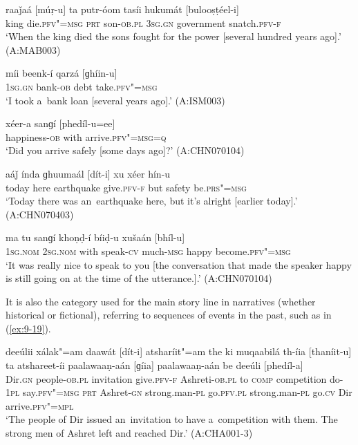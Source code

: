 \begin{exe}
\ex
\label{ex:9-14}
\gll raaǰaá [múṛ-u] ta putr-óom tasíi hukumát [bulooṣṭéel-i] \\
king die.\textsc{pfv"=msg} \textsc{prt} son-\textsc{ob.pl} \textsc{3sg.gn} government snatch.\textsc{pfv-f} \\
\glt `When the king died the sons fought for the power [several hundred years ago].' (A:MAB003)

\ex
\label{ex:9-15}
\gll míi beenk-í qarzá [ɡhíin-u]  \\
\textsc{1sg.gn} bank-\textsc{ob} debt take.\textsc{pfv"=msg} \\
\glt `I took a~bank loan [several years ago].' (A:ISM003) 

\ex
\label{ex:9-16}
\gll xéer-a sanɡí [phedíl-u=ee] \\
happiness-\textsc{ob} with arrive.\textsc{pfv"=msg=q} \\
\glt `Did you arrive safely [some days ago]?' (A:CHN070104)

\ex
\label{ex:9-17}
\gll aáǰ índa ɡhuumaál [dít-i] xu xéer hín-u \\
today here earthquake give.\textsc{pfv-f} but safety be.\textsc{prs"=msg}  \\
\glt `Today there was an~earthquake here, but it's alright [earlier today].' (A:CHN070403)

\ex
\label{ex:9-18}
\gll ma tu sanɡí khoṇḍ-í bíiḍ-u xušaán [bhíl-u] \\
\textsc{1sg.nom} \textsc{2}\textsc{sg.nom} with speak-\textsc{cv} much-\textsc{msg} happy become.\textsc{pfv"=msg} \\
\glt `It was really nice to speak to you [the conversation that made the speaker happy is still going on at the time of the utterance.].' (A:CHN070104)
\end{exe}

It is also the category used for the main story line in narratives (whether historical or fictional), referring to sequences of events in the past, such as in (\ref{ex:9-19}).

\begin{exe}
\ex
\label{ex:9-19}
\gll deeúlii xálak"=am daawát [dít-i] atsharíit"=am the ki muqaabilá
th-íia  [thaníit-u] ta atshareet-íi paalawaaṇ-aán [ɡíia] paalawaaṇ-aán be deeúli [phedíl-a] \\
Dir.\textsc{gn} people-\textsc{ob.pl} invitation give.\textsc{pfv-f}  Ashreti-\textsc{ob.pl} to \textsc{comp} competition do-\textsc{1pl}  say.\textsc{pfv"=msg} \textsc{prt} Ashret-\textsc{gn} strong.man-\textsc{pl} go.\textsc{pfv.pl}  strong.man-\textsc{pl} go.\textsc{cv} Dir arrive.\textsc{pfv"=mpl} \\
\glt `The people of Dir issued an~invitation to have a~competition with them. The strong men of Ashret left and reached Dir.' (A:CHA001-3)
\end{exe}

